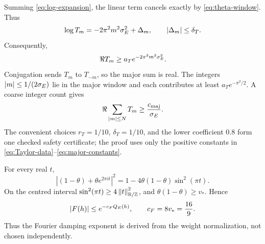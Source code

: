 Summing \eqref{eq:log-expansion}, the linear term cancels exactly by
\eqref{eq:theta-window}.  Thus
\[
 \log T_m=-2\pi^2m^2\sigma_E^2+\Delta_m,
 \qquad |\Delta_m|\le\delta_T.
\]
Consequently,
\begin{equation}\label{eq:per-main}
 \Re T_m\ge a_Te^{-2\pi^2m^2\sigma_E^2}.
\end{equation}
Conjugation sends $T_m$ to $T_{-m}$, so the major sum is real.  The integers
$|m|\le1/(2\sigma_E)$ lie in the major window and each contributes at least
$a_Te^{-\pi^2/2}$.  A coarse integer count gives
\begin{equation}\label{eq:main-lower}
 \Re\sum_{|m|\le N}T_m\ge\frac{c_{\mathrm{maj}}}{\sigma_E}.
\end{equation}
The convenient choices $r_T=1/10$, $\delta_T=1/10$, and the lower coefficient
$0.8$ form one checked safety certificate; the proof uses only the positive
constants in \eqref{eq:Taylor-data}--\eqref{eq:major-constants}.

For every real $t$,
\[
 |(1-\theta)+\theta e^{2\pi it}|^2
 =1-4\theta(1-\theta)\sin^2(\pi t).
\]
On the centred interval $\sin^2(\pi t)\ge4\left\lVert t\right\rVert_{\mathbb R/\mathbb Z}^2$, and
$\theta(1-\theta)\ge v_*$.  Hence
\begin{equation}\label{eq:fourier-energy}
 |F(h)|\le e^{-c_FQ_E(h)},
 \qquad
 c_F=8v_*=\frac{16}{9}.
\end{equation}
Thus the Fourier damping exponent is derived from the weight normalization, not
chosen independently.
